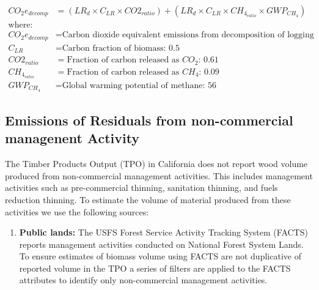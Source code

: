 \documentclass[a4paper]{article}
\begin{document}
\begin{align*}
CO_2e_{decomp} &= \left(LR_d \times C_{LR} \times CO2_{ratio} \right) + \left(LR_d \times C_{LR} \times CH_4_{ratio}\times GWP_{CH_4}\right)\\
\text{where:}\\
CO_2e_{decomp} &= \text{Carbon dioxide equivalent emissions from decomposition of logging slash}\\
C_{LR} &= \text{Carbon fraction of biomass: 0.5}\\
CO2_{ratio} &= \text{Fraction of carbon released as } CO_2\text{: 0.61}\\
CH_4_{ratio} &= \text{Fraction of carbon released as } CH_4\text{: 0.09}\\
GWP_{CH_4} &= \text{Global warming potential of methane: 56}
\end{align*}

\subsection{Emissions of Residuals from non-commercial managenent Activity}
\label{sec:orgheadline18}

The Timber Products Output (TPO) in California does not report wood volume produced from
non-commercial management activities. This includes management
activities such as pre-commercial thinning, sanitation thinning, and
fuels reduction thinning. To estimate the volume of material produced
from these activities we use the following sources:

\begin{enumerate}
\item \textbf{Public lands:} The USFS Forest Service Activity Tracking System
(FACTS) reports management activities conducted on National Forest
System Lands. To ensure estimates of biomass volume using FACTS are
not duplicative of reported volume in the TPO a series of filters are
applied to the FACTS attributes to identify only non-commercial
management activities.
\end{enumerate}
\end{document}
